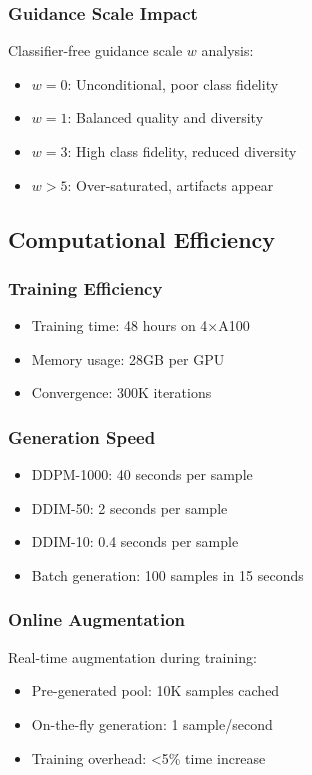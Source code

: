 \documentclass[journal]{IEEEtran}
\begin{document}
\subsubsection{Guidance Scale Impact}
Classifier-free guidance scale $w$ analysis:
\begin{itemize}
\item $w=0$: Unconditional, poor class fidelity
\item $w=1$: Balanced quality and diversity
\item $w=3$: High class fidelity, reduced diversity
\item $w>5$: Over-saturated, artifacts appear
\end{itemize}

\subsection{Computational Efficiency}

\subsubsection{Training Efficiency}
\begin{itemize}
\item Training time: 48 hours on 4×A100
\item Memory usage: 28GB per GPU
\item Convergence: 300K iterations
\end{itemize}

\subsubsection{Generation Speed}
\begin{itemize}
\item DDPM-1000: 40 seconds per sample
\item DDIM-50: 2 seconds per sample
\item DDIM-10: 0.4 seconds per sample
\item Batch generation: 100 samples in 15 seconds
\end{itemize}

\subsubsection{Online Augmentation}
Real-time augmentation during training:
\begin{itemize}
\item Pre-generated pool: 10K samples cached
\item On-the-fly generation: 1 sample/second
\item Training overhead: <5\% time increase
\end{itemize}
\end{document}
